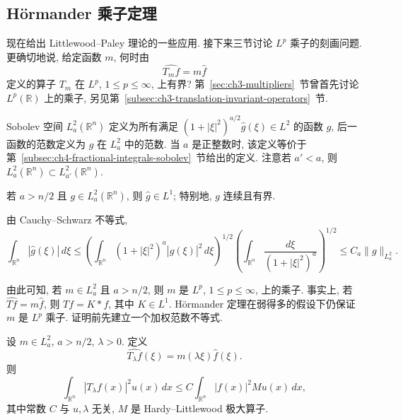\subsection{Hörmander 乘子定理}
\label{sec:ch8-hormander-multiplier}

现在给出 Littlewood--Paley 理论的一些应用. 接下来三节讨论 $L^p$ 乘子的刻画问题. 更确切地说, 给定函数 $m$, 何时由
\[
 \widehat{T_mf}=m\widehat f
\]
定义的算子 $T_m$ 在 $L^p$, $1\le p\le\infty$, 上有界? 第~\ref{sec:ch3-multipliers}~节曾首先讨论 $L^p(\mathbb R)$ 上的乘子, 另见第~\ref{subsec:ch3-translation-invariant-operators}~节.

Sobolev 空间 $L_a^2(\mathbb R^n)$ 定义为所有满足 $(1+|\xi|^2)^{a/2}\widehat g(\xi)\in L^2$ 的函数 $g$, 后一函数的范数定义为 $g$ 在 $L_a^2$ 中的范数. 当 $a$ 是正整数时, 该定义等价于第~\ref{subsec:ch4-fractional-integrals-sobolev}~节给出的定义. 注意若 $a'<a$, 则 $L_a^2(\mathbb R^n)\subset L_{a'}^2(\mathbb R^n)$.

\begin{Proposition}
\label{prop:ch8-sobolev-l1}
若 $a>n/2$ 且 $g\in L_a^2(\mathbb R^n)$, 则 $\widehat g\in L^1$; 特别地, $g$ 连续且有界.
\end{Proposition}

\begin{Proof}
由 Cauchy--Schwarz 不等式,
\[
 \int_{\mathbb R^n}|\widehat g(\xi)|\,d\xi
 \le\left(\int_{\mathbb R^n}(1+|\xi|^2)^a|\widehat g(\xi)|^2\,d\xi\right)^{1/2}
 \left(\int_{\mathbb R^n}\frac{d\xi}{(1+|\xi|^2)^a}\right)^{1/2}
 \le C_a\|g\|_{L_a^2}.
\]
\end{Proof}

\hypertarget{chapter-08-page-176}{}
由此可知, 若 $m\in L_a^2$ 且 $a>n/2$, 则 $m$ 是 $L^p$, $1\le p\le\infty$, 上的乘子. 事实上, 若 $\widehat{Tf}=m\widehat f$, 则 $Tf=K*f$, 其中 $K\in L^1$. Hörmander 定理在弱得多的假设下仍保证 $m$ 是 $L^p$ 乘子. 证明前先建立一个加权范数不等式.

\begin{Lemma}
\label{lem:ch8-scaled-multiplier-weighted}
设 $m\in L_a^2$, $a>n/2$, $\lambda>0$. 定义
\[
 \widehat{T_\lambda f}(\xi)=m(\lambda\xi)\widehat f(\xi).
\]
则
\[
 \int_{\mathbb R^n}|T_\lambda f(x)|^2u(x)\,dx
 \le C\int_{\mathbb R^n}|f(x)|^2Mu(x)\,dx,
\]
其中常数 $C$ 与 $u,\lambda$ 无关, $M$ 是 Hardy--Littlewood 极大算子.
\end{Lemma}


